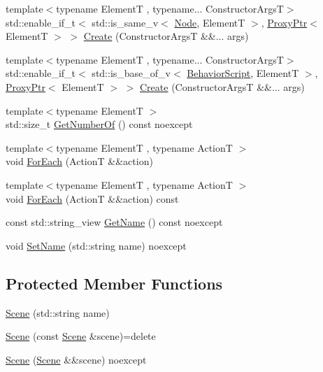 \begin{DoxyCompactItemize}
\item 
{\footnotesize template$<$typename ElementT , typename... Constructor\+ArgsT$>$ }\\std\+::enable\+\_\+if\+\_\+t$<$ std\+::is\+\_\+same\+\_\+v$<$ \mbox{\hyperlink{classmage_1_1_node}{Node}}, ElementT $>$, \mbox{\hyperlink{classmage_1_1_proxy_ptr}{Proxy\+Ptr}}$<$ ElementT $>$ $>$ \mbox{\hyperlink{classmage_1_1_scene_a8ce3f5152ad4b0935a08cc2f0a53383c}{Create}} (Constructor\+ArgsT \&\&... args)
\item 
{\footnotesize template$<$typename ElementT , typename... Constructor\+ArgsT$>$ }\\std\+::enable\+\_\+if\+\_\+t$<$ std\+::is\+\_\+base\+\_\+of\+\_\+v$<$ \mbox{\hyperlink{classmage_1_1_behavior_script}{Behavior\+Script}}, ElementT $>$, \mbox{\hyperlink{classmage_1_1_proxy_ptr}{Proxy\+Ptr}}$<$ ElementT $>$ $>$ \mbox{\hyperlink{classmage_1_1_scene_ab135fe20ddadf6c1e2820a9582a31e64}{Create}} (Constructor\+ArgsT \&\&... args)
\item 
{\footnotesize template$<$typename ElementT $>$ }\\std\+::size\+\_\+t \mbox{\hyperlink{classmage_1_1_scene_a293dcd3f77701f22c66d053eb0a4cc0f}{Get\+Number\+Of}} () const noexcept
\item 
{\footnotesize template$<$typename ElementT , typename ActionT $>$ }\\void \mbox{\hyperlink{classmage_1_1_scene_a8bb2cd615a6c500677d4816fceb8cce3}{For\+Each}} (ActionT \&\&action)
\item 
{\footnotesize template$<$typename ElementT , typename ActionT $>$ }\\void \mbox{\hyperlink{classmage_1_1_scene_ac71dc52550c59256c30537b8dc9ca720}{For\+Each}} (ActionT \&\&action) const
\item 
const std\+::string\+\_\+view \mbox{\hyperlink{classmage_1_1_scene_a0ef75ab12ff3b6b2d22798f40ba7d1c5}{Get\+Name}} () const noexcept
\item 
void \mbox{\hyperlink{classmage_1_1_scene_a97a8efab5b4aa9f78b451ea2c68b300e}{Set\+Name}} (std\+::string name) noexcept
\end{DoxyCompactItemize}
\subsection*{Protected Member Functions}
\begin{DoxyCompactItemize}
\item 
\mbox{\hyperlink{classmage_1_1_scene_a3434f00f7b9552cfd7a9f073290830cb}{Scene}} (std\+::string name)
\item 
\mbox{\hyperlink{classmage_1_1_scene_a88d83ccb2e10549d5370f850b2b4c228}{Scene}} (const \mbox{\hyperlink{classmage_1_1_scene}{Scene}} \&scene)=delete
\item 
\mbox{\hyperlink{classmage_1_1_scene_afeae10a3a50bf1d624faa6bd0bf33a7d}{Scene}} (\mbox{\hyperlink{classmage_1_1_scene}{Scene}} \&\&scene) noexcept
\end{DoxyCompactItemize}
